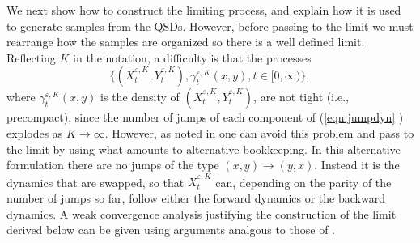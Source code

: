\documentclass[english,11pt]{article}%
\numberwithin{equation}{section}
\numberwithin{example}{section}
\numberwithin{theorem}{section}
\begin{document}
We next show how to construct the limiting process, and explain how it is used
to generate samples from the QSDs. However, before passing to the limit we
must rearrange how the samples are organized so there is a well defined limit.
Reflecting $K$ in the notation, a difficulty is that the processes
\begin{equation}
\{(\bar{X}_{t}^{\varepsilon,K},\bar{Y}_{t}^{\varepsilon,K}),\gamma
_{t}^{\varepsilon,K}(x,y),t\in\lbrack0,\infty)\}, \label{eqn:jumpdyn}%
\end{equation}
where $\gamma_{t}^{\varepsilon,K}(x,y)$ is the density of $(\bar{X}%
_{t}^{\varepsilon,K},\bar{Y}_{t}^{\varepsilon,K})$, are not tight (i.e.,
precompact), since the number of jumps of each component of (\ref{eqn:jumpdyn}%
) explodes as $K\rightarrow\infty$. However, as noted in \cite{dupliupladol}
one can avoid this problem and pass to the limit by using what amounts to
alternative bookkeeping. In this alternative formulation there are no jumps of
the type $(x,y)\rightarrow(y,x)$. Instead it is the dynamics that are swapped,
so that $\bar{X}_{t}^{\varepsilon,K}$ can, depending on the parity of the
number of jumps so far, follow either the forward dynamics or the backward
dynamics. A weak convergence analysis justifying the construction of the limit
derived below can be given using arguments analgous to those of
\cite{dupliupladol}.
\end{document}
